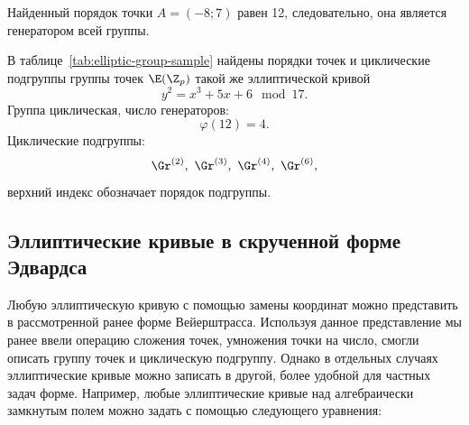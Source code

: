 Найденный порядок точки $A = (-8; 7)$ равен 12, следовательно, она является генератором всей группы.

В таблице~\ref{tab:elliptic-group-sample} найдены порядки точек и циклические подгруппы группы точек $\E(\Z_p)$ такой же эллиптической кривой
    \[ y^2 = x^3 + 5 x + 6 \mod 17. \]
Группа циклическая, число генераторов:
    \[ \varphi(12) = 4. \]
Циклические подгруппы:
    \[ \Gr^{(2)}, ~ \Gr^{(3)}, ~ \Gr^{(4)}, ~ \Gr^{(6)}, \]
верхний индекс обозначает порядок подгруппы.

\begin{table}[!ht]
    \centering
    \caption{Генераторы и циклические подгруппы группы точек эллиптической кривой\label{tab:elliptic-group-sample}}
\end{table}

\subsection{Эллиптические кривые в скрученной форме Эдвардса}\label{sec:twisted-edward-curves}

Любую эллиптическую кривую с помощью замены координат можно представить в рассмотренной ранее форме Вейерштрасса. Используя данное представление мы ранее ввели операцию сложения точек, умножения точки на число, смогли описать группу точек и циклическую подгруппу. Однако в отдельных случаях эллиптические кривые можно записать в другой, более удобной для частных задач форме. Например, любые эллиптические кривые над алгебраически замкнутым полем можно задать с помощью следующего уравнения:

